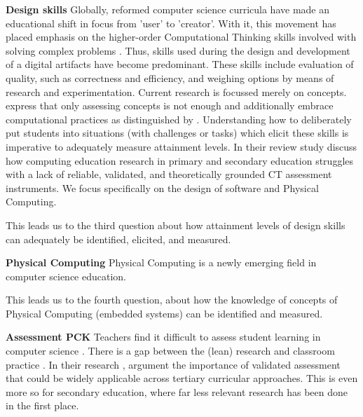 \noindent \textbf{Design skills}\newline
Globally, reformed computer science curricula have made an educational shift in focus from 'user' to 'creator'. With it, this movement has placed emphasis on the higher-order Computational Thinking skills involved with solving complex problems \cite{Wing2006}. Thus, skills used during the design and development of a digital artifacts have become predominant. These skills include evaluation of quality, such as correctness and efficiency, and weighing options by means of research and experimentation. Current research is focussed merely on concepts.  express that only assessing concepts is not enough and additionally embrace computational practices as distinguished by \citeauthor{BrennanResnick2012}. Understanding how to deliberately put students into situations (with challenges or tasks) which elicit these skills is imperative to adequately measure attainment levels. In their review study  discuss how computing education research in primary and secondary education struggles with a lack of reliable, validated, and theoretically grounded CT assessment instruments. We focus specifically on the design of software and Physical Computing.

This leads us to the third question about how attainment levels of design skills can adequately be identified, elicited, and measured.




\noindent \textbf{Physical Computing}\newline
Physical Computing is a newly emerging field in computer science education.

This leads us to the fourth question, about how the knowledge of concepts of Physical Computing (embedded systems) can be identified and measured.



\noindent \textbf{Assessment PCK}\newline
Teachers find it difficult to assess student learning in computer science \cite{yadav2016pck}. There is a gap between the (lean) research and classroom practice \cite{Yadav2015}. In their research , argument the importance of validated assessment that could be widely applicable across tertiary curricular approaches. This is even more so for secondary education, where far less relevant research has been done in the first place.



